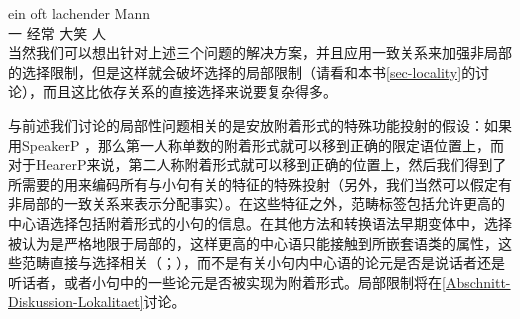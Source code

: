 \ex
\gll ein oft lachender Mann\\
     一 经常 大笑 人\\
\zl     
当然我们可以想出针对上述三个问题的解决方案，并且应用一致关系来加强非局部的选择限制，但是这样就会破坏选择的局部限制（请看\citealp[]{Ernst92a}和本书\ref{sec-locality}的讨论），而且这比依存关系的直接选择来说要复杂得多。

与前述我们讨论的局部性问题相关的是安放附着形式的特殊功能投射的假设：如果用SpeakerP ，那么第一人称单数的附着形式就可以移到正确的限定语位置上，而对于HearerP来说，第二人称附着形式就可以移到正确的位置上\citep[]{Poletto2000a-u}，然后我们得到了所需要的用来编码所有与小句有关的特征的特殊投射（另外，我们当然可以假定有非局部的一致关系来表示分配事实）。在这些特征之外，范畴标签包括允许更高的中心语选择包括附着形式的小句的信息。在其他方法和转换语法早期变体中，选择被认为是严格地限于局部的，这样更高的中心语只能接触到所嵌套语类的属性，这些范畴直接与选择相关（\citealp[]{Abraham2005a}；\citealp{Sag2007a}），而不是有关小句内中心语的论元是否是说话者还是听话者，或者小句中的一些论元是否被实现为附着形式。局部限制将在\ref{Abschnitt-Diskussion-Lokalitaet}讨论。


